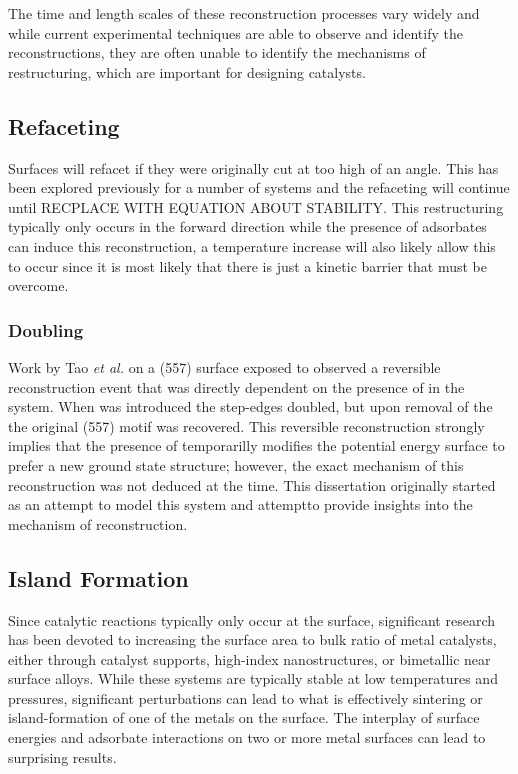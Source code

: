 The time and length scales of these reconstruction processes vary
widely\citep{} and while current experimental techniques are able to observe
and identify the reconstructions, they are often unable to identify the
mechanisms of restructuring, which are important for designing catalysts.

\subsection{Refaceting}
Surfaces will refacet if they were originally cut at too high of an angle. This
has been explored previously for a number of systems\citep{} and the refaceting
will continue until RECPLACE WITH EQUATION ABOUT STABILITY. This restructuring
typically only occurs in the forward direction while the presence of adsorbates
can induce this reconstruction, a temperature increase will also likely allow
this to occur since it is most likely that there is just a kinetic barrier that
must be overcome. 

\subsubsection{Doubling}
Work by Tao {\it et al.} on a  (557) surface exposed to  observed
a reversible reconstruction event that was directly dependent on the presence
of  in the system. When  was introduced the step-edges doubled,
but upon removal of the  the original (557) motif was recovered. This
reversible reconstruction strongly implies that the presence of 
temporarilly modifies the potential energy surface to prefer a new ground state
structure; however, the exact mechanism of this reconstruction was not deduced
at the time. This dissertation originally started as an attempt to model this
system and attemptto provide insights into the mechanism of reconstruction. 

\subsection{Island Formation}
Since catalytic reactions typically only occur at the surface, significant
research has been devoted to increasing the surface area to bulk ratio of metal
catalysts, either through catalyst supports, high-index nanostructures, or
bimetallic near surface alloys. While these systems are typically stable at low
temperatures and pressures, significant perturbations can lead to what is
effectively sintering or island-formation of one of the metals on the surface.
The interplay of surface energies and adsorbate interactions on two or more
metal surfaces can lead to surprising results.
